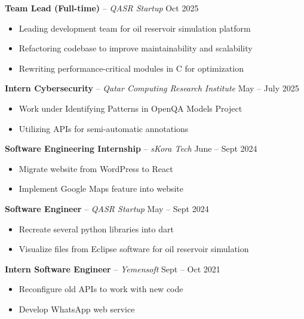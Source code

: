\documentclass[11pt,a4paper]{article}
\begin{document}
\textbf{Team Lead (Full-time)} -- \textit{QASR Startup} \hfill Oct 2025
\begin{itemize}[leftmargin=2em, nosep, label={}]
    \item Leading development team for oil reservoir simulation platform
    \item Refactoring codebase to improve maintainability and scalability
    \item Rewriting performance-critical modules in C for optimization
\end{itemize}

\vspace{4pt}

\textbf{Intern Cybersecurity} -- \textit{Qatar Computing Research Institute} \hfill May -- July 2025
\begin{itemize}[leftmargin=2em, nosep, label={}]
    \item Work under Identifying Patterns in OpenQA Models Project
    \item Utilizing APIs for semi-automatic annotations
\end{itemize}

\vspace{4pt}

\textbf{Software Engineering Internship} -- \textit{sKora Tech} \hfill June -- Sept 2024
\begin{itemize}[leftmargin=2em, nosep, label={}]
    \item Migrate website from WordPress to React
    \item Implement Google Maps feature into website
\end{itemize}

\vspace{4pt}

\textbf{Software Engineer} -- \textit{QASR Startup} \hfill May -- Sept 2024
\begin{itemize}[leftmargin=2em, nosep, label={}]
    \item Recreate several python libraries into dart
    \item Visualize files from Eclipse software for oil reservoir simulation
\end{itemize}

\vspace{4pt}

\textbf{Intern Software Engineer} -- \textit{Yemensoft} \hfill Sept -- Oct 2021
\begin{itemize}[leftmargin=2em, nosep, label={}]
    \item Reconfigure old APIs to work with new code
    \item Develop WhatsApp web service
\end{itemize}
\end{document}
